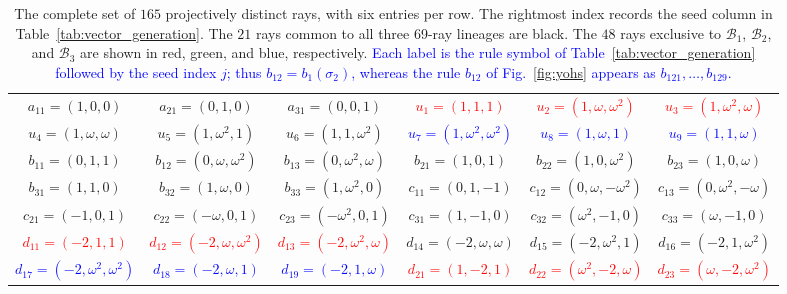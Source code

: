 \documentclass[%
  reprint,
  superscriptaddress,
  showkeys,
  amsmath,amssymb,
  aps,pra,
  longbibliography,
  floatfix,
  x11names
]{revtex4-2}
\DeclareRobustCommand{\chg}[1]{\textcolor{blue}{#1}}
\begin{document}
\begin{table}[htbp!]
\caption{
The complete set of $165$ projectively distinct rays, with six entries per row.  The rightmost index records the seed column in Table~\ref{tab:vector_generation}.  The $21$ rays common to all three 69-ray lineages are black.  The $48$ rays exclusive to $\mathcal{B}_1$, $\mathcal{B}_2$, and $\mathcal{B}_3$ are shown in red, green, and blue, respectively.  \chg{Each label is the rule symbol of Table~\ref{tab:vector_generation} followed by the seed index $j$; thus $b_{12}=b_1(\sigma_2)$, whereas the rule $b_{12}$ of Fig.~\ref{fig:yohs} appears as $b_{121},\ldots,b_{129}$.}
}
\label{tab:noncollinear_vectors_6col}
\footnotesize %
\begin{ruledtabular}
\begin{tabular}{*{6}{c}} %
{$a_{11}=(1,0,0)$} & {$a_{21}=(0,1,0)$} & {$a_{31}=(0,0,1)$} & \textcolor{red}{$u_{1}=(1,1,1)$} & \textcolor{red}{$u_{2}=(1,\omega,\omega^2)$} & \textcolor{red}{$u_{3}=(1,\omega^2,\omega)$} \\
\textcolor{green!40!black}{$u_{4}=(1,\omega,\omega)$} & \textcolor{green!40!black}{$u_{5}=(1,\omega^2,1)$} & \textcolor{green!40!black}{$u_{6}=(1,1,\omega^2)$} & \textcolor{blue}{$u_{7}=(1,\omega^2,\omega^2)$} & \textcolor{blue}{$u_{8}=(1,\omega,1)$} & \textcolor{blue}{$u_{9}=(1,1,\omega)$} \\
{$b_{11}=(0,1,1)$} & {$b_{12}=(0,\omega,\omega^2)$} & {$b_{13}=(0,\omega^2,\omega)$} & {$b_{21}=(1,0,1)$} & {$b_{22}=(1,0,\omega^2)$} & {$b_{23}=(1,0,\omega)$} \\
{$b_{31}=(1,1,0)$} & {$b_{32}=(1,\omega,0)$} & {$b_{33}=(1,\omega^2,0)$} & {$c_{11}=(0,1,-1)$} & {$c_{12}=(0,\omega,-\omega^2)$} & {$c_{13}=(0,\omega^2,-\omega)$} \\
{$c_{21}=(-1,0,1)$} & {$c_{22}=(-\omega,0,1)$} & {$c_{23}=(-\omega^2,0,1)$} & {$c_{31}=(1,-1,0)$} & {$c_{32}=(\omega^2,-1,0)$} & {$c_{33}=(\omega,-1,0)$} \\
\textcolor{red}{$d_{11}=(-2,1,1)$} & \textcolor{red}{$d_{12}=(-2,\omega,\omega^2)$} & \textcolor{red}{$d_{13}=(-2,\omega^2,\omega)$} & \textcolor{green!40!black}{$d_{14}=(-2,\omega,\omega)$} & \textcolor{green!40!black}{$d_{15}=(-2,\omega^2,1)$} & \textcolor{green!40!black}{$d_{16}=(-2,1,\omega^2)$} \\
\textcolor{blue}{$d_{17}=(-2,\omega^2,\omega^2)$} & \textcolor{blue}{$d_{18}=(-2,\omega,1)$} & \textcolor{blue}{$d_{19}=(-2,1,\omega)$} & \textcolor{red}{$d_{21}=(1,-2,1)$} & \textcolor{red}{$d_{22}=(\omega^2,-2,\omega)$} & \textcolor{red}{$d_{23}=(\omega,-2,\omega^2)$} \\

\end{tabular}
\end{ruledtabular}
\end{table}
\end{document}
